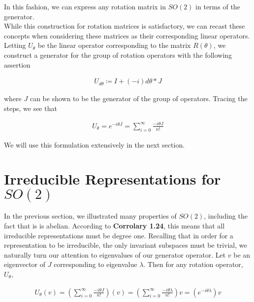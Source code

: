 \documentclass[10pt]{ucthesis}
\begin{document}
In this fashion, we can express any rotation matrix in $SO(2)$ in terms of the generator. \\

While this construction for rotation matrices is satisfactory, we can recast these concepts when considering these matrices as their corresponding linear operators. Letting $U_\theta$ be the linear operator corresponding to the matrix $R(\theta)$, we construct a generator for the group of rotation operators with the following assertion

\begin{equation}
	\begin{aligned}
		U_{d\theta} \coloneq I + (-i)d\theta * J
	\end{aligned}
\end{equation}  

where $J$ can be shown to be the generator of the group of operators. Tracing the steps, we see that 

\begin{equation}
	\begin{aligned}
		U_\theta = e^{-i\theta J} = \sum_{i=0}^\infty \frac{-i\theta J}{n!}
	\end{aligned}
\end{equation}  


We will use this formulation extensively in the next section.


\section{Irreducible Representations for $SO(2)$}

In the previous section, we illustrated many properties of $SO(2)$, including the fact that is is abelian. According to \textbf{Corrolary 1.24}, this means that all irreducible representations must be degree one. Recalling that in order for a representation to be irreducible, the only invariant subspaces must be trivial, we naturally turn our attention to eigenvalues of our generator operator. Let $v$ be an eigenvector of $J$ corresponding to eigenvalue $\lambda$. Then for any rotation operator, $U_\theta$,


\begin{equation}
	\begin{aligned}
		U_\theta (v) = \left(\sum_{i=0}^\infty \frac{-i\theta J}{n!}\right) (v) = \left(\sum_{i=0}^\infty \frac{-i\theta \lambda}{n!}\right)v = \left(e^{-i\theta \lambda}\right)v
	\end{aligned}
\end{equation}
\end{document}
